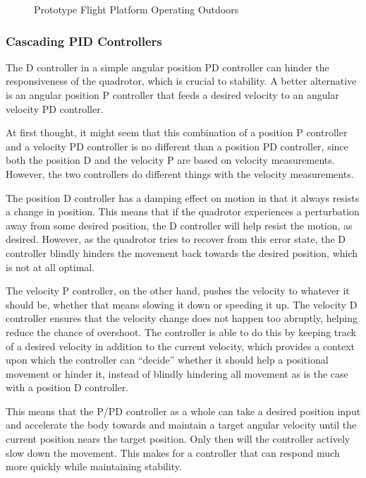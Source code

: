 \documentclass[12pt,letterpaper]{article}
\begin{document}
\begin{figure}[h!] \caption{Prototype Flight Platform Operating Outdoors}
\end{figure}



\subsubsection*{Cascading PID Controllers}

The D controller in a simple angular position PD controller can hinder the
responsiveness of the quadrotor, which is crucial to stability. A better
alternative is an angular position P controller that feeds a desired velocity
to an angular velocity PD controller.

At first thought, it might seem that this combination of a position P
controller and a velocity PD controller is no different than a position PD
controller, since both the position D and the velocity P are based on velocity
measurements. However, the two controllers do different things with the
velocity measurements.

The position D controller has a damping effect on motion in that it always
resists a change in position. This means that if the quadrotor experiences a
perturbation away from some desired position, the D controller will help resist
the motion, as desired. However, as the quadrotor tries to recover from this
error state, the D controller blindly hinders the movement back towards the
desired position, which is not at all optimal.

The velocity P controller, on the other hand, pushes the velocity to whatever
it should be, whether that means slowing it down or speeding it up. The
velocity D controller ensures that the velocity change does not happen too
abruptly, helping reduce the chance of overshoot. The controller is able to do
this by keeping track of a desired velocity in addition to the current
velocity, which provides a context upon which the controller can ``decide''
whether it should help a positional movement or hinder it, instead of blindly
hindering all movement as is the case with a position D controller.

This means that the P/PD controller as a whole can take a desired position
input and accelerate the body towards and maintain a target angular velocity
until the current position nears the target position. Only then will the
controller actively slow down the movement. This makes for a controller that
can respond much more quickly while maintaining stability.
\end{document}
